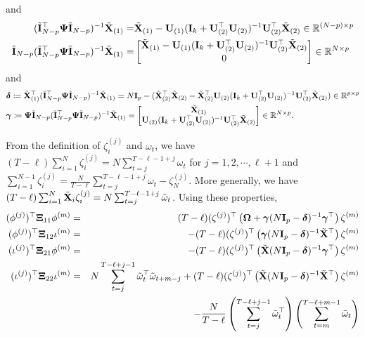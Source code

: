 			and
			\begin{align*}
			    (\tilde{\mathbf{I}}_{N-p}^\top \bm{\Psi} \tilde{\mathbf{I}}_{N-p} )^{-1} \tilde{\mathbf{X}}_{(1)} =&\tilde{\mathbf{X}}_{(1)} - \mathbf{U}_{(1)} (\mathbf{I}_k + \mathbf{U}_{(2)}^\top \mathbf{U}_{(2)} )^{-1} \mathbf{U}_{(2)}^\top \tilde{\mathbf{X}}_{(2)}  \in \mathbb{R}^{(N-p) \times p} \\
				 \tilde{\mathbf{I}}_{N-p} (\tilde{\mathbf{I}}_{N-p}^\top \bm{\Psi} \tilde{\mathbf{I}}_{N-p} )^{-1} \tilde{\mathbf{X}}_{(1)}  =& \begin{bmatrix}
					\tilde{\mathbf{X}}_{(1)} - \mathbf{U}_{(1)} (\mathbf{I}_k + \mathbf{U}_{(2)}^\top \mathbf{U}_{(2)} )^{-1} \mathbf{U}_{(2)}^\top \tilde{\mathbf{X}}_{(2)}   \\ 0
				\end{bmatrix}  \in \mathbb{R}^{N \times p} 
			\end{align*}
			and
			\begin{align*}
			&	\bm{\delta} \coloneqq \tilde{\mathbf{X}}_{(1)}^\top (\tilde{\mathbf{I}}_{N-p}^\top \bm{\Psi} \tilde{\mathbf{I}}_{N-p} )^{-1} \tilde{\mathbf{X}}_{(1)}  = N \mathbf{I}_p - (\tilde{\mathbf{X}}_{(2)}^\top \tilde{\mathbf{X}}_{(2)}  - \tilde{\mathbf{X}}_{(2)}^\top \mathbf{U}_{(2)} (\mathbf{I}_k + \mathbf{U}_{(2)}^\top \mathbf{U}_{(2)} )^{-1} \mathbf{U}_{(2)}^\top \tilde{\mathbf{X}}_{(2)} ) \in \mathbb{R}^{p \times p} \\
		&		\bm{\gamma} \coloneqq \mathbf{\Psi} \tilde{\mathbf{I}}_{N-p} (\tilde{\mathbf{I}}_{N-p}^\top \bm{\Psi} \tilde{\mathbf{I}}_{N-p} )^{-1} \tilde{\mathbf{X}}_{(1)}  = \begin{bmatrix}
					\tilde{\mathbf{X}}_{(1)} \\  \mathbf{U}_{(2)} (\mathbf{I}_k + \mathbf{U}_{(2)}^\top \mathbf{U}_{(2)} )^{-1} \mathbf{U}_{(2)}^\top \tilde{\mathbf{X}}_{(2)} 
				\end{bmatrix}\in \mathbb{R}^{N \times p}.
			\end{align*}
	
		From the definition of $\zeta_i^{(j)} $ and $\omega_t$, we have $(T - \ell) \sum_{i = 1}^N \zeta_i^{(j)} = N \sum_{t=j}^{T - \ell-1+j} \omega_t$ for $j = 1, 2, \cdots, \ell+1$ and $ \sum_{i = 1}^{N-1} \zeta_i^{(j)} = \frac{N}{T - \ell} \sum_{t=j}^{T - \ell-1+j} \omega_t - \zeta_N^{(j)} $. More generally, we have $(T - \ell) \sum_{i = 1}^N \tilde{\mathbf{X}}_i \zeta_i^{(j)} = N \sum_{t=j}^{T - \ell-1+j}  \tilde{\omega}_t$. 
		Using these properties, 
		\begin{eqnarray*}
			(\phi^{(j)})^\top \bm{\Xi}_{11} \phi^{(m)} &=& (T - \ell)  (\zeta^{(j)})^\top \left( \mathbf{\Omega} +  \bm{\gamma} (N \mathbf{I}_p - \bm{\delta})^{-1} \bm{\gamma}^\top  \right) \zeta^{(m)} \\
			(\phi^{(j)})^\top \bm{\Xi}_{12} \iota^{(m)} &=&  -(T - \ell)  (\zeta^{(j)})^\top \left(  \bm{\gamma} (N \mathbf{I}_p - \bm{\delta})^{-1} \tilde{\mathbf{X}}^\top \right) \zeta^{(m)}  \\
			(\iota^{(j)})^\top \bm{\Xi}_{21} \phi^{(m)} &=&  - (T - \ell) (\zeta^{(j)})^\top \left(   \tilde{\mathbf{X}}  (N \mathbf{I}_p - \bm{\delta})^{-1} \bm{\gamma}^\top \right) \zeta^{(m)}  \\
			(\iota^{(j)})^\top \bm{\Xi}_{22} \iota^{(m)} &=& N \sum_{t=j}^{T - \ell+j-1} \tilde \omega_{t}^\top \tilde \omega_{t+m-j}  + (T - \ell)  (\zeta^{(j)})^\top \left(   \tilde{\mathbf{X}} (N \mathbf{I}_p - \bm{\delta})^{-1}  \tilde{\mathbf{X}}^\top \right) \zeta^{(m)} \\ && - \frac{N}{T - \ell}  \left( \sum_{t=j}^{T - \ell+j-1} \tilde \omega_t^\top  \right)  \left( \sum_{t=m}^{T - \ell+m-1} \tilde \omega_t \right)
		\end{eqnarray*}
		

